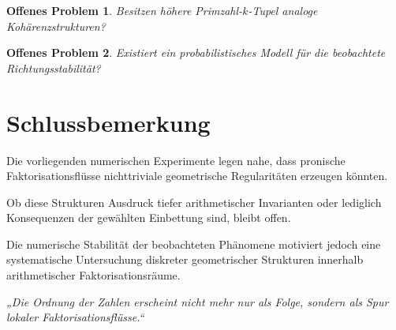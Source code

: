\documentclass[11pt,a4paper]{article}
\newtheorem{problem}{Offenes Problem}
\begin{document}
	\begin{problem}
		Besitzen höhere Primzahl-\(k\)-Tupel analoge Kohärenzstrukturen?
	\end{problem}
	
	\begin{problem}
		Existiert ein probabilistisches Modell für die beobachtete Richtungsstabilität?
	\end{problem}
	
	\section{Schlussbemerkung}
	
	Die vorliegenden numerischen Experimente legen nahe, dass pronische Faktorisationsflüsse nichttriviale geometrische Regularitäten erzeugen könnten.
	
	Ob diese Strukturen Ausdruck tiefer arithmetischer Invarianten oder lediglich Konsequenzen der gewählten Einbettung sind, bleibt offen.
	
	Die numerische Stabilität der beobachteten Phänomene motiviert jedoch eine systematische Untersuchung diskreter geometrischer Strukturen innerhalb arithmetischer Faktorisationsräume.
	
	\vspace{1em}
	
	\begin{center}
		\emph{
			„Die Ordnung der Zahlen erscheint nicht mehr nur als Folge, sondern als Spur lokaler Faktorisationsflüsse.“
		}
	\end{center}
	
\end{document}
